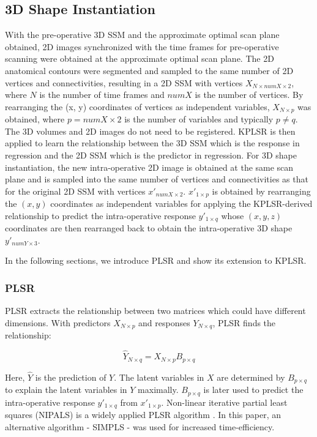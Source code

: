 \documentclass[review]{elsarticle}
\begin{document}
\subsection{3D Shape Instantiation}
\label{Sec: Prediction}
With the pre-operative 3D SSM and the approximate optimal scan plane obtained, 2D images synchronized with the time frames for pre-operative scanning were obtained at the approximate optimal scan plane. The 2D anatomical contours were segmented and sampled to the same number of 2D vertices and connectivities, resulting in a 2D SSM with vertices $X_{N\times numX\times 2}$, where $N$ is the number of time frames and $numX$ is the number of vertices. By rearranging the (x, y) coordinates of vertices as independent variables, $X_{N\times p}$ was obtained, where $p=numX\times 2$ is the number of variables and typically $p\neq q$. The 3D volumes and 2D images do not need to be registered. KPLSR is then applied to learn the relationship between the 3D SSM which is the response in regression and the 2D SSM which is the predictor in regression. For 3D shape instantiation, the new intra-operative 2D image is obtained at the same scan plane and is sampled into the same number of vertices and connectivities as that for the original 2D SSM with vertices $x'_{numX\times 2}$. $x'_{1\times p}$ is obtained  by rearranging the $(x,y)$ coordinates as independent variables for applying the KPLSR-derived relationship to predict the intra-operative response $y'_{1\times q}$ whose $(x,y,z)$ coordinates are then rearranged back to obtain the intra-operative 3D shape $y'_{numY\times 3}$. 

In the following sections, we introduce PLSR and show its extension to KPLSR.

\subsubsection{PLSR}
PLSR extracts the relationship between two matrices which could have different dimensions. With predictors $X_{N\times p}$ and responses $Y_{N\times q}$, PLSR finds the relationship:

\begin{equation}
\hat{Y}_{{N\times q}}=X_{N\times p}B_{p\times q}
\end{equation}

Here, $\hat{Y}$ is the prediction of $Y$. The latent variables in $X$ are determined by $B_{p\times q}$ to explain the latent variables in $Y$ maximally. $B_{p\times q}$ is later used to predict the intra-operative response $y'_{1\times q}$ from $x'_{1\times p}$. Non-linear iterative partial least squares (NIPALS) is a widely applied PLSR algorithm \citep{rosipal2001kernel}. In this paper, an alternative algorithm - SIMPLS \citep{de1993simpls} - was used for increased time-efficiency.
\end{document}
